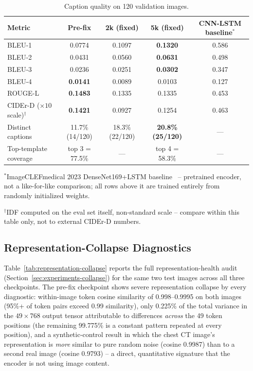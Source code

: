 \documentclass[conference]{IEEEtran}
\begin{document}
\begin{table}[t]
\centering
\caption{Caption quality on 120 validation images.}
\label{tab:caption-quality}
\small
\renewcommand{\arraystretch}{1.10}
\begin{tabular}{@{}p{}cccc@{}}
\toprule
\textbf{Metric} & \textbf{Pre-fix} & \textbf{2k (fixed)} & \textbf{5k (fixed)} & \textbf{CNN-LSTM baseline$^\ast$} \\
\midrule
BLEU-1 & 0.0774 & 0.1097 & \textbf{0.1320} & 0.586 \\
BLEU-2 & 0.0431 & 0.0560 & \textbf{0.0631} & 0.498 \\
BLEU-3 & 0.0236 & 0.0251 & \textbf{0.0302} & 0.347 \\
BLEU-4 & \textbf{0.0141} & 0.0089 & 0.0103 & 0.127 \\
ROUGE-L & \textbf{0.1483} & 0.1335 & 0.1335 & 0.453 \\
CIDEr-D ($\times 10$ scale)$^\dagger$ & \textbf{0.1421} & 0.0927 & 0.1254 & 0.463 \\
Distinct captions & 11.7\% (14/120) & 18.3\% (22/120) & \textbf{20.8\% (25/120)} & --- \\
Top-template coverage & top 3 = 77.5\% & --- & top 4 = 58.3\% & --- \\
\bottomrule
\end{tabular}

\vspace{2pt}
\begin{minipage}{0.96\textwidth}
\footnotesize
$^\ast$ImageCLEFmedical 2023 DenseNet169+LSTM baseline~\cite{ruckert2023imageclef} -- pretrained encoder, not a like-for-like comparison; all rows above it are trained entirely from randomly initialized weights.

$^\dagger$IDF computed on the eval set itself, non-standard scale -- compare within this table only, not to external CIDEr-D numbers.
\end{minipage}
\end{table}

\subsection{Representation-Collapse Diagnostics}
\label{sec:results-collapse}

Table~\ref{tab:representation-collapse} reports the full representation-health audit (Section~\ref{sec:experiments-collapse}) for the same two test images across all three checkpoints. The pre-fix checkpoint shows severe representation collapse by every diagnostic: within-image token cosine similarity of 0.998--0.9995 on both images (95\%+ of token pairs exceed 0.99 similarity), only 0.225\% of the total variance in the $49\times768$ output tensor attributable to differences \emph{across} the 49 token positions (the remaining 99.775\% is a constant pattern repeated at every position), and a synthetic-control result in which the chest CT image's representation is \emph{more} similar to pure random noise (cosine 0.9987) than to a second real image (cosine 0.9793) -- a direct, quantitative signature that the encoder is not using image content.
\end{document}
